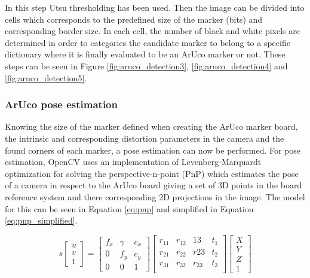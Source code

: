 \documentclass[../Head/report.tex]{subfiles}
\begin{document}
In this step Utsu thresholding has been used. Then the image can be divided into cells which corresponds to the predefined size of the marker (bits) and corresponding border size. In each cell, the number of black and white pixels are determined in order to categories the candidate marker to belong to a specific dictionary where it is finally evaluated to be an ArUco marker or not. These steps can be seen in Figure \ref{fig:aruco_detection3}, \ref{fig:aruco_detection4} and \ref{fig:aruco_detection5}. 

\subsubsection{ArUco pose estimation}

Knowing the size of the marker defined when creating the ArUco marker board, the intrinsic and corresponding distortion parameters in the camera and the found corners of each marker, a pose estimation can now be performed. For pose estimation, OpenCV uses an implementation of Levenberg-Marquardt optimization for solving the perspective-n-point (PnP) which estimates the pose of a camera in respect to the ArUco board giving a set of 3D points in the board reference system and there corresponding 2D projections in the image. The model for this can be seen in Equation \ref{eq:pnp} and simplified in Equation \ref{eq:pnp_simplified}.

\begin{equation}
	s	
	\begin{bmatrix}
		u\\
		v\\
		1
	\end{bmatrix}
	=
	\begin{bmatrix}
		f_x & \gamma & c_x\\
		0 & f_y & c_y\\
		0 & 0 & 1
	\end{bmatrix}
	\begin{bmatrix}
		r_11 & r_12 & 13 & t_1\\
		r_21 & r_22 & r23 & t_2 \\
		r_31 & r_32 & r_33 & t_3 \\
	\end{bmatrix}
	\begin{bmatrix}
		X\\
		Y\\
		Z\\
		1
	\end{bmatrix}
	\label{eq:pnp}
\end{equation}
\end{document}
